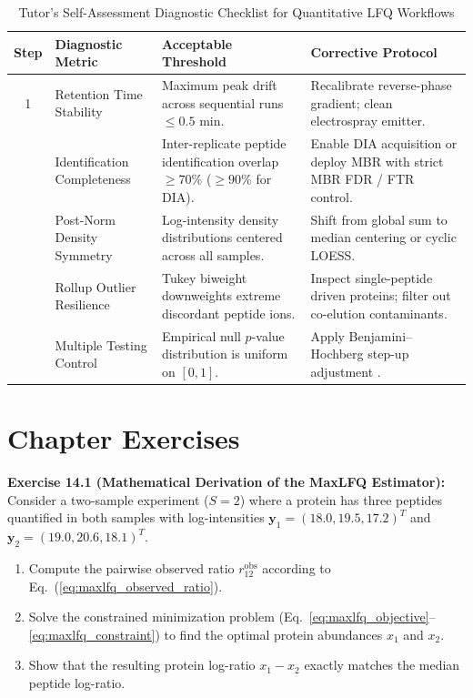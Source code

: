 \documentclass[11pt,oneside]{book}
\begin{document}
\begin{table}[ht]
\centering
\caption{Tutor's Self-Assessment Diagnostic Checklist for Quantitative LFQ Workflows}
\label{tab:lfq_checklist}
\small
\begin{tabularx}{\textwidth}{c p{4.2cm} p{4.5cm} X}
\toprule
\textbf{Step} & \textbf{Diagnostic Metric} & \textbf{Acceptable Threshold} & \textbf{Corrective Protocol} \\
\midrule
1 & Retention Time Stability & Maximum peak drift across sequential runs $\le 0.5$ min. & Recalibrate reverse-phase gradient; clean electrospray emitter. \\
\addlinespace
2 & Identification Completeness & Inter-replicate peptide identification overlap $\ge 70\%$ ($\ge 90\%$ for DIA). & Enable DIA acquisition or deploy MBR with strict MBR FDR / FTR control. \\
\addlinespace
3 & Post-Norm Density Symmetry & Log-intensity density distributions centered across all samples. & Shift from global sum to median centering or cyclic LOESS. \\
\addlinespace
4 & Rollup Outlier Resilience & Tukey biweight downweights extreme discordant peptide ions. & Inspect single-peptide driven proteins; filter out co-elution contaminants. \\
\addlinespace
5 & Multiple Testing Control & Empirical null $p$-value distribution is uniform on $[0, 1]$. & Apply Benjamini--Hochberg step-up adjustment \cite{benjamini1995controlling}. \\
\bottomrule
\end{tabularx}
\end{table}

\section{Chapter Exercises}

\noindent\textbf{Exercise 14.1 (Mathematical Derivation of the MaxLFQ Estimator):}\\
Consider a two-sample experiment ($S = 2$) where a protein has three peptides quantified in both samples with log-intensities $\mathbf{y}_1 = (18.0, 19.5, 17.2)^T$ and $\mathbf{y}_2 = (19.0, 20.6, 18.1)^T$.
\begin{enumerate}
    \item Compute the pairwise observed ratio $r_{12}^{\text{obs}}$ according to Eq.~(\ref{eq:maxlfq_observed_ratio}).
    \item Solve the constrained minimization problem (Eq.~\ref{eq:maxlfq_objective}--\ref{eq:maxlfq_constraint}) to find the optimal protein abundances $x_1$ and $x_2$.
    \item Show that the resulting protein log-ratio $x_1 - x_2$ exactly matches the median peptide log-ratio.
\end{enumerate}
\end{document}
